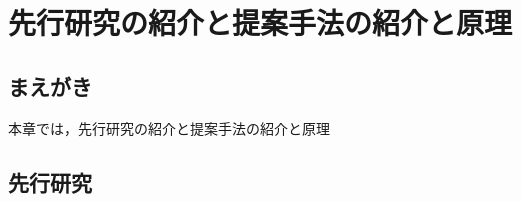 \chapter{先行研究の紹介と提案手法の紹介と原理}
\label{sec:methods}

\section{まえがき}
本章では，先行研究の紹介と提案手法の紹介と原理

\section{先行研究}
\label{sec:svd}

